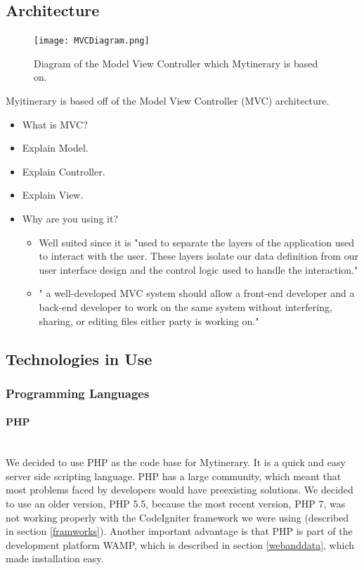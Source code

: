 \documentclass[12pt]{article}
\begin{document}
\subsection{Architecture}

\begin{figure}[ht!]
\centering
\texttt{[image: MVCDiagram.png]}
\caption{Diagram of the Model View Controller which Mytinerary is based on. \label{MVC}}
\end{figure}

Myitinerary is based off of the Model View Controller (MVC) architecture.

\begin{itemize}
    \item What is MVC?
    \item Explain Model.
    \item Explain Controller.
    \item Explain View.
    \item Why are you using it?
    \begin{itemize}
        \item Well suited since it is "used to separate the layers of the application used to interact with the user. These layers isolate our data definition from our user interface design and the control logic used to handle the interaction."
        \item " a well-developed MVC system should allow a front-end developer and a back-end developer to work on the same system without interfering, sharing, or editing files either party is working on."
    \end{itemize}
\end{itemize}
\subsection{Technologies in Use} \label{techInUse}
%
%
\subsubsection{Programming Languages} \label{languages}
\paragraph*{PHP}~\\
We decided to use PHP as the code base for Mytinerary. It is a quick and easy server side scripting language. PHP has a large community, which meant that most problems faced by developers would have preexisting solutions. We decided to use an older version, PHP 5.5, because the most recent version, PHP 7, was not working properly with the CodeIgniter framework we were using (described in section \ref{framworks}). Another important advantage is that PHP is part of the development platform WAMP, which is described in section \ref{webanddata}, which made installation easy.
%
\end{document}
